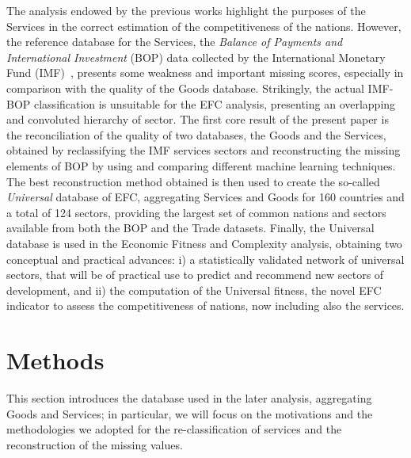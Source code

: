 \documentclass[fleqn,10pt]{article}
\begin{document}
The analysis endowed by the previous works highlight the purposes of the Services in the correct estimation of the competitiveness of the nations.
However, the reference database for the Services, the \textit{Balance of Payments and International Investment} (BOP) data collected by the International Monetary Fund (IMF)~\cite{BOPS}, presents some weakness and important missing scores, especially in comparison with the quality of the Goods database. 
Strikingly, the actual IMF-BOP classification is unsuitable for the EFC analysis, presenting an overlapping and convoluted hierarchy of sector.
The first core result of the present paper is the reconciliation of the quality of two databases, the Goods and the Services, obtained by reclassifying the IMF services sectors and reconstructing the missing elements of BOP by using and comparing different machine learning techniques.
The best reconstruction method obtained is then used to create the so-called \textit{Universal} database of EFC, aggregating Services and Goods for 160 countries and a total of 124 sectors, providing the largest set of common nations and sectors available from both the BOP and the Trade datasets.
Finally, the Universal database is used in the Economic Fitness and Complexity analysis, obtaining two conceptual and practical advances: i) a statistically validated network of universal sectors, that will be of practical use to predict and recommend new sectors of development, and ii) the computation of the Universal fitness, the novel EFC indicator to assess the competitiveness of nations, now including also the services.



\section*{Methods}
This section introduces the database used in the later analysis, aggregating Goods and Services; in particular, we will focus on the motivations and the methodologies we adopted for the re-classification of services and the reconstruction of the missing values.
\end{document}
